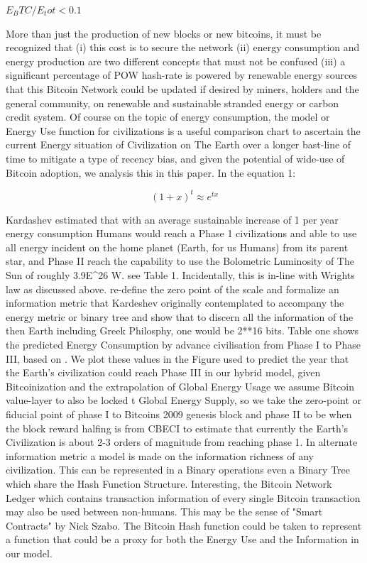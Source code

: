 \documentclass[final,5p,times,twocolumn,authoryear]{elsarticle}
\begin{document}
$E_BTC/E_tot < 0.1$

More than just the production of new blocks or new bitcoins, it must be recognized that (i) this cost is to secure the network (ii) energy consumption and energy production are two different concepts that must not be confused (iii) a significant percentage of POW hash-rate is powered by renewable energy sources that this Bitcoin Network could be updated if desired by miners, holders and the general community, on renewable and sustainable stranded energy or carbon credit system. Of course on the topic of energy consumption, the \cite{kar64} model or Energy Use function for civilizations is a useful comparison chart to ascertain the current Energy situation of Civilization on The Earth over a longer bast-line of time to mitigate a type of recency bias, and given the potential of wide-use of Bitcoin adoption, we analysis this in this paper. In the \cite{kar64} equation 1:

\begin{equation}
    (1+x)^t \approx e^{tx}
\end{equation}

Kardashev estimated that with an average sustainable increase of 1 \percent per year energy consumption Humans would reach a Phase 1 civilizations and able to use all energy incident on the home planet (Earth, for us Humans) from its parent star, and Phase II reach the capability to use the Bolometric Luminosity of The Sun of roughly 3.9E^26 W. see Table 1. Incidentally, this is in-line with Wrights law as  discussed above. \cite{Sagan73} re-define the zero point of the scale and formalize an information metric that Kardeshev originally contemplated to accompany the energy metric or binary tree and show that to discern all the information of the then Earth including Greek Philosphy, one would be 2**16 bits. Table one shows the predicted Energy Consumption by advance civilisation from Phase I to Phase III, based on \cite{kar64}. We plot these values in the Figure  used to predict the year that the Earth's civilization could reach Phase III in our hybrid model, given Bitcoinization and the extrapolation of Global Energy Usage we assume Bitcoin value-layer to also be locked t Global Energy Supply, so we take the zero-point or fiducial point of phase I to Bitcoins 2009 genesis block and phase II to be when the block reward halfing is from CBECI to  estimate that currently the Earth's Civilization is about 2-3 orders of magnitude from reaching phase 1. In \cite{Sagan73} alternate information metric a model is made on the information richness of any civilization. This can be represented in a Binary operations even a Binary Tree which share the Hash Function Structure. Interesting, the Bitcoin Network Ledger which contains transaction information of every single Bitcoin transaction may also be used between non-humans. This may be the sense of "Smart Contracts" by Nick Szabo. The Bitcoin Hash function could be taken to represent a function that could be a proxy for both the Energy Use and the Information in our model. 
\end{document}

